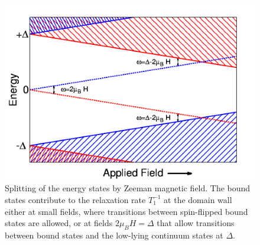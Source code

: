 \documentclass[prb,aps,showpacs,amsmath,twocolumn,10pt]{revtex4-1}
\begin{document}
\begin{figure}
\includegraphics[scale=0.25]{./Fig5_NoArrow} 
\caption{\label{fig:rel_trans}
Splitting of the energy states by Zeeman magnetic field. The bound states contribute to the relaxation rate 
$T_1^{-1}$ at the domain wall either at small fields, where transitions between spin-flipped bound states are allowed, 
or at fields $2\mu_B H = \Delta$ that allow transitions between bound states and the low-lying continuum 
states at $\Delta$. 
}
\end{figure}

\end{document}
